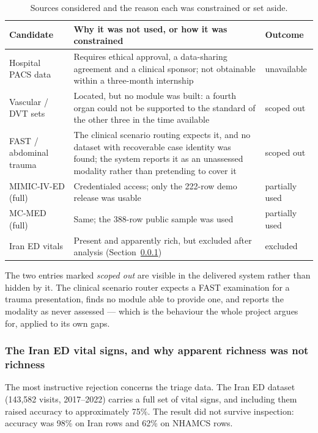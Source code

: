 \begin{table}[H]
  \centering
  \small
  \begin{tabularx}{\textwidth}{@{}lXl@{}}
    \toprule
    Candidate & Why it was not used, or how it was constrained & Outcome \\
    \midrule
    Hospital PACS data & Requires ethical approval, a data-sharing agreement and a clinical
      sponsor; not obtainable within a three-month internship & unavailable \\
    Vascular / DVT sets & Located, but no module was built: a fourth organ could not be
      supported to the standard of the other three in the time available & scoped out \\
    FAST / abdominal trauma & The clinical scenario routing expects it, and no dataset with
      recoverable case identity was found; the system reports it as an unassessed modality
      rather than pretending to cover it & scoped out \\
    MIMIC-IV-ED (full) & Credentialed access; only the 222-row demo release was usable &
      partially used \\
    MC-MED (full) & Same; the 388-row public sample was used & partially used \\
    Iran ED vitals & Present and apparently rich, but excluded after analysis
      (Section~\ref{app:data-search-iran}) & excluded \\
    \bottomrule
  \end{tabularx}
  \caption{Sources considered and the reason each was constrained or set aside.}
  \label{tab:data-search}
\end{table}

The two entries marked \emph{scoped out} are visible in the delivered system rather than
hidden by it. The clinical scenario router expects a FAST examination for a trauma
presentation, finds no module able to provide one, and reports the modality as never assessed
--- which is the behaviour the whole project argues for, applied to its own gaps.

\subsubsection{The Iran ED vital signs, and why apparent richness was not richness}
\label{app:data-search-iran}

The most instructive rejection concerns the triage data. The Iran ED dataset (143{,}582 visits,
2017--2022) carries a full set of vital signs, and including them raised accuracy to
approximately 75\%. The result did not survive inspection: accuracy was 98\% on Iran rows and
62\% on NHAMCS rows.

